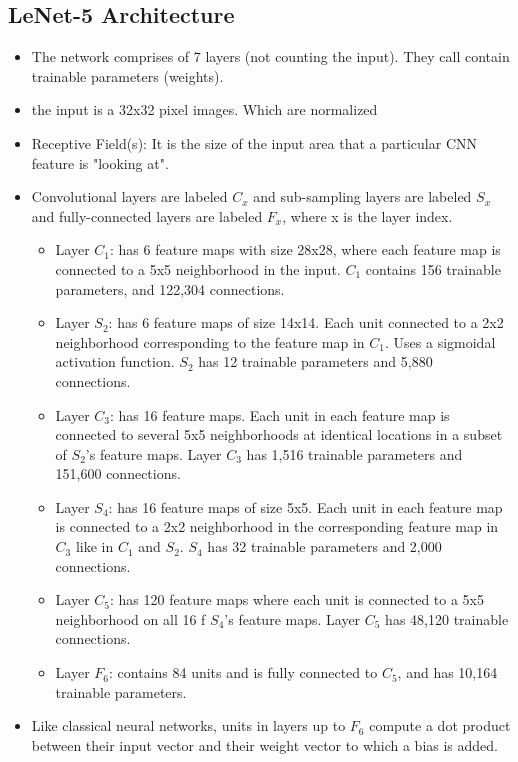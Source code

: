 \documentclass{article}
\begin{document}
    \subsection*{LeNet-5 Architecture}
    \begin{itemize}
        \item The network comprises of 7 layers (not counting the input). They call contain trainable parameters (weights).
        \item the input is a 32x32 pixel images. Which are normalized
        \item Receptive Field(s): It is the size of the input area that a particular CNN feature is "looking at".
        \item Convolutional layers are labeled $C_x$ and sub-sampling layers are labeled $S_x$ and fully-connected layers are labeled $F_x$, where x is the layer index.
            \begin{itemize}
                \item Layer $C_1$: has 6 feature maps with size 28x28, where each feature map is connected to a 5x5 neighborhood in the input. $C_1$ contains 156 trainable parameters, and 122,304 connections.
                \item Layer $S_2$: has 6 feature maps of size 14x14. Each unit connected to a 2x2 neighborhood corresponding to the feature map in $C_1$. Uses a sigmoidal activation function. $S_2$ has 12 trainable parameters and 5,880 connections.
                \item Layer $C_3$: has 16 feature maps. Each unit in each feature map is connected to several 5x5 neighborhoods at identical locations in a subset of $S_2$'s feature maps. Layer $C_3$ has 1,516 trainable parameters and 151,600 connections.
                \item Layer $S_4$: has 16 feature maps of size 5x5. Each unit in each feature map is connected to a 2x2 neighborhood in the corresponding feature map in $C_3$ like in $C_1$ and $S_2$. $S_4$ has 32 trainable parameters and 2,000 connections.
                \item Layer $C_5$: has 120 feature maps where each unit is connected to a 5x5 neighborhood on all 16 f $S_4$'s feature maps. Layer $C_5$ has 48,120 trainable connections.
                \item Layer $F_6$: contains 84 units and is fully connected to $C_5$, and has 10,164 trainable parameters.
            \end{itemize}
        \item Like classical neural networks, units in layers up to $F_6$ compute a dot product between their input vector and their weight vector to which a bias is added. 

\end{itemize}
\end{document}
